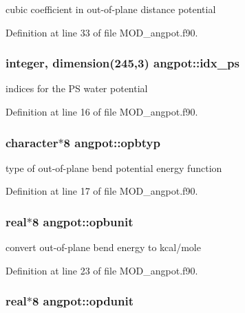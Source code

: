 cubic coefficient in out-\/of-\/plane distance potential 



Definition at line 33 of file M\-O\-D\-\_\-angpot.\-f90.

\hypertarget{classangpot_ac4149a45e7c9088c1871be5e677f5ddf}{
\subsubsection[{idx\-\_\-ps}]{\setlength{\rightskip}{0pt plus 5cm}integer, dimension(245,3) angpot\-::idx\-\_\-ps}}\label{classangpot_ac4149a45e7c9088c1871be5e677f5ddf}


indices for the P\-S water potential 



Definition at line 16 of file M\-O\-D\-\_\-angpot.\-f90.

\hypertarget{classangpot_a328cc042e26166f2def1064890ae696d}{
\subsubsection[{opbtyp}]{\setlength{\rightskip}{0pt plus 5cm}character$\ast$8 angpot\-::opbtyp}}\label{classangpot_a328cc042e26166f2def1064890ae696d}


type of out-\/of-\/plane bend potential energy function 



Definition at line 17 of file M\-O\-D\-\_\-angpot.\-f90.

\hypertarget{classangpot_a16ef8e589e9ccff08841188f4eb8b15f}{
\subsubsection[{opbunit}]{\setlength{\rightskip}{0pt plus 5cm}real$\ast$8 angpot\-::opbunit}}\label{classangpot_a16ef8e589e9ccff08841188f4eb8b15f}


convert out-\/of-\/plane bend energy to kcal/mole 



Definition at line 23 of file M\-O\-D\-\_\-angpot.\-f90.

\hypertarget{classangpot_a9e21db37db7e7ce534b644cd9e3850f0}{
\subsubsection[{opdunit}]{\setlength{\rightskip}{0pt plus 5cm}real$\ast$8 angpot\-::opdunit}}\label{classangpot_a9e21db37db7e7ce534b644cd9e3850f0}


